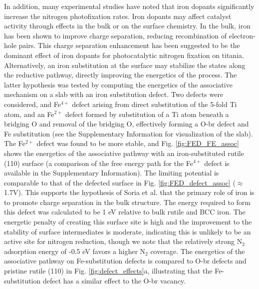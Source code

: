 \documentclass[journal=ascecg,manuscript=article,articletitle=true]{achemso}
\begin{document}
In addition, many experimental studies have noted that iron dopants significantly increase the nitrogen photofixation rates.\cite{Schrauzer_1977,Schrauzer_1983,Augugliaro_1982,Soria_1991} Iron dopants may affect catalyst activity through effects in the bulk or on the surface chemistry. In the bulk, iron has been shown to improve charge separation, reducing recombination of electron-hole pairs. This charge separation enhancement has been suggested to be the dominant effect of iron dopants for photocatalytic nitrogen fixation on titania. \cite{Soria_1991} Alternatively, an iron substitution at the surface may stabilize the states along the reductive pathway, directly improving the energetics of the process. The latter hypothesis was tested by computing the energetics of the associative mechanism on a slab with an iron substitution defect. Two defects were considered, and Fe$^{4+}$ defect arising from direct substitution of the 5-fold Ti atom, and an Fe$^{2+}$ defect formed by substitution of a Ti atom beneath a bridging O and removal of the bridging O, effectively forming a O-br defect and Fe substitution (see the Supplementary Information for visualization of the slab). The Fe$^{2+}$ defect was found to be more stable, and Fig. \ref{fig:FED_FE_assoc} shows the energetics of the associative pathway with an iron-substituted rutile (110) surface (a comparison of the free energy path for the Fe$^{4+}$ defect is available in the Supplementary Information). The limiting potential is comparable to that of the defected surface in Fig. \ref{fig:FED_defect_assoc} ($\approx$ 1.7V). This supports the hypothesis of Soria et al.\cite{Soria_1991} that the primary role of iron is to promote charge separation in the bulk structure. The energy required to form this defect was calculated to be 1 eV relative to bulk rutile and BCC iron. 
The energetic penalty of creating this surface site is high and the improvement to the stability of surface intermediates is moderate, indicating this is unlikely to be an active site for nitrogen reduction, though we note that the relatively strong N$_2$ adsorption energy of -0.5 eV favors a higher N$_2$ coverage. The energetics of the associative pathway on Fe-substitution defects is compared to O-br defects and pristine rutile (110) in Fig. \ref{fig:defect_effects}a, illustrating that the Fe-substitution defect has a similar effect to the O-br vacancy. %
\end{document}
